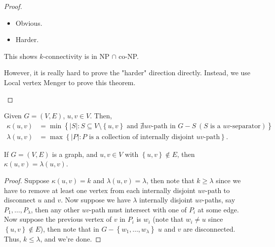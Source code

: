 \begin{proof}
    \hfill 
    \begin{itemize}
        \item [\((\impliedby)\)] Obvious. 
        \item [\((\implies )\)] Harder.
    \end{itemize}

    \begin{remark}
        This shows \(k\)-connectivity is in NP \(\cap \) co-NP.  
    \end{remark}

    \begin{remark}
        However, it is really hard to prove the "harder" direction directly. Instead, we use Local vertex Menger to prove this theorem.
    \end{remark}
\end{proof}

\begin{definition}
    Given \(G = (V, E)\), \(u, v \in V\). Then,
    \begin{align*}
        \kappa (u, v) &= \min \left\{ \vert S \vert: S \subseteq V \setminus \left\{ u, v \right\} \text{ and } \nexists uv\text{-path in } G - S \ (S \text{ is a } uv \text{-separator})    \right\}   \\
        \lambda (u, v) &= \max \left\{ \vert P \vert: P \text{ is a collection of internally disjoint } uv\text{-path}    \right\}.  
    \end{align*}  
\end{definition}

\begin{theorem}
    If \(G = (V, E)\) is a graph, and \(u, v \in V\) with \(\left\{ u, v \right\} \notin E \), then \(\kappa (u, v) = \lambda (u, v)\).    
\end{theorem}

\begin{proof}
    Suppose \(\kappa (u, v) = k\) and \(\lambda (u, v) = \lambda \), then note that \(k \ge \lambda\) since we have to remove at least one vertex from each internally disjoint \(uv\)-path to disconnect \(u\) and \(v\). Now suppose we have \(\lambda \) internally disjoint \(uv\)-paths, say \(P_1, \dots , P_{\lambda}\), then any other \(uv\)-path must intersect with one of \(P_i\) at some edge. Now suppose the previous vertex of \(v\) in \(P_i\) is \(w_i\) (note that \(w_i \neq u\) since \(\left\{ u, v \right\} \notin E \)), then note that in \(G - \left\{ w_1, \dots , w_\lambda  \right\} \) \(u\) and \(v\) are disconnected. Thus, \(k \le \lambda \), and we're done.           
\end{proof}

